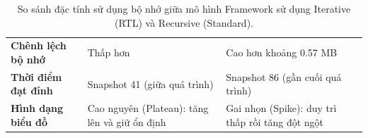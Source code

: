 \begin{itemize}[label=-, leftmargin=1.5cm]
\begin{table}[H]
{\begin{tabular}{@{}p{4cm} p{5.5cm} p{5.5cm}@{}}
				\textbf{Chênh lệch bộ nhớ} 
				& Thấp hơn 
				& Cao hơn khoảng 0.57 MB \\
				
				\textbf{Thời điểm đạt đỉnh} 
				& Snapshot 41 \newline (giữa quá trình) 
				& Snapshot 86 \newline (gần cuối quá trình) \\
				
				\textbf{Hình dạng biểu đồ} 
				& Cao nguyên (Plateau): \newline tăng lên và giữ ổn định 
				& Gai nhọn (Spike): \newline duy trì thấp rồi tăng đột ngột \\
				
				\bottomrule
			\end{tabular}
		}
		\caption{So sánh đặc tính sử dụng bộ nhớ giữa mô hình Framework sử dụng Iterative (RTL) và Recursive (Standard).}
		\label{tab:memory_iterative_recursive}
	\end{table}
\end{itemize}